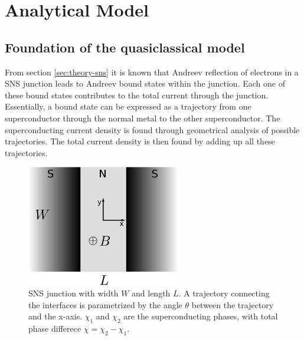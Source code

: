 \chapter{Analytical Model}
\label{ch:analyticalmodel}

\section{Foundation of the quasiclassical model}
From section \ref{sec:theory-sns} it is known that Andreev reflection of electrons in a SNS junction leads to Andreev bound states within the junction. Each one of these bound states contributes to the total current through the junction. Essentially, a bound state can be expressed as a trajectory from one superconductor through the normal metal to the other superconductor. The superconducting current density is found through geometrical analysis of possible trajectories. The total current density is then found by adding up all these trajectories.
\begin{figure}[h]
\centering	
\includegraphics[width=0.6\textwidth]{figure/analyticalmodel/sns_junction}
\caption{SNS junction with width $W$ and length $L$. A trajectory connecting the interfaces is parametrized by the angle $\theta$ between the trajectory and the x-axis. $\chi_1$ and $\chi_2$ are the superconducting phases, with total phase differece $\chi = \chi_2 - \chi_1$.}
\label{fig:sns_schematic}
\end{figure}
